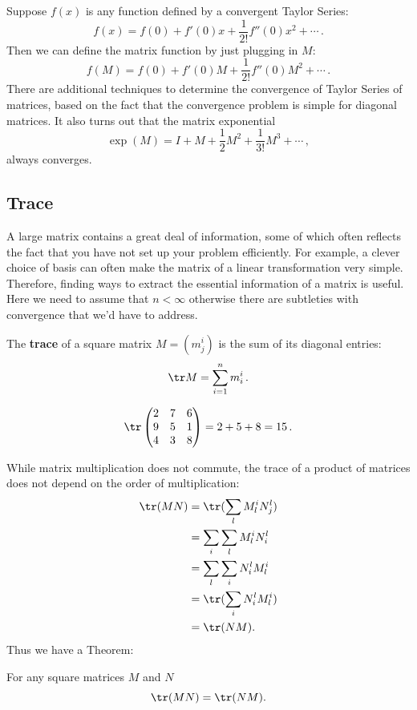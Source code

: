 Suppose $f(x)$ is any function defined by a convergent Taylor Series:
\[
f(x) = f(0) + f'(0)x + \frac{1}{2!}f''(0)x^2 + \cdots\, .
\]
Then we can define the matrix function by just plugging in $M$:
\[
f(M) = f(0) + f'(0)M + \frac{1}{2!}f''(0)M^2 + \cdots\, .
\]
There are additional techniques to determine the convergence of Taylor Series of matrices, based on the fact that the convergence problem is simple for diagonal matrices.  It also turns out that the matrix exponential
\[\exp (M) = I + M + \frac{1}{2}M^2 + \frac{1}{3!}M^3 + \cdots\, ,\] always converges.



\subsection{Trace}

A large matrix contains a great deal of information, some of which often reflects the fact that you have not set up your problem efficiently. For example, a clever choice of basis can often make the matrix of a linear transformation very simple. Therefore, finding ways to extract the essential information of a matrix is useful. Here we need to assume that $n < \infty$ otherwise there are subtleties with convergence that we'd have to address.

\begin{definition}
The \hypertarget{TRACE}{{\bfseries trace}} of a square matrix $M=(m_j^i)$ is the sum of its diagonal entries:
\[
\tr M = \sum_{i=1}^{n}m_i^i\, .
\]
\end{definition}

\begin{example}
\[
\tr \begin{pmatrix}
2 & 7 & 6\\
9 & 5 & 1\\
4 & 3 & 8\\
\end{pmatrix} = 2+5+8 = 15\, .
\]
\end{example}
While matrix multiplication does not commute, the trace of a product of matrices does not depend on the order of multiplication:
\begin{align*}
\tr(MN) & = \tr( \sum_l M_l^i N_j^l ) \\
& = \sum_i \sum_l M_l^i N_i^l \\
& = \sum_l \sum_i N_i^l M_l^i \\
& = \tr( \sum_i N_i^l M_l^i ) \\
& = \tr( NM ).
\end{align*}
Thus we have a Theorem:
\begin{theorem} For any square matrices $M$ and $N$ \[\tr(MN)=\tr(NM).\]
\end{theorem}

